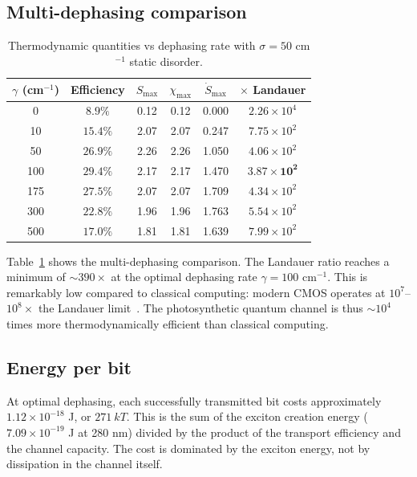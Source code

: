 \documentclass[aps,prl,twocolumn,showpacs,superscriptaddress]{revtex4-2}
\begin{document}
\subsection{Multi-dephasing comparison}

\begin{table}[htbp]
\caption{Thermodynamic quantities vs dephasing rate with $\sigma = 50$ cm$^{-1}$ static disorder.}
\label{tab:multigamma}
\centering
\begin{tabular}{cccccc}
\toprule
$\gamma$ (cm$^{-1}$) & Efficiency & $S_{\max}$ & $\chi_{\max}$ & $\dot{S}_{\max}$ & $\times$ Landauer \\
\midrule
0 & $8.9\%$ & 0.12 & 0.12 & 0.000 & $2.26\times10^4$ \\
10 & $15.4\%$ & 2.07 & 2.07 & 0.247 & $7.75\times10^2$ \\
50 & $26.9\%$ & 2.26 & 2.26 & 1.050 & $4.06\times10^2$ \\
100 & $29.4\%$ & 2.17 & 2.17 & 1.470 & $\mathbf{3.87\times10^2}$ \\
175 & $27.5\%$ & 2.07 & 2.07 & 1.709 & $4.34\times10^2$ \\
300 & $22.8\%$ & 1.96 & 1.96 & 1.763 & $5.54\times10^2$ \\
500 & $17.0\%$ & 1.81 & 1.81 & 1.639 & $7.99\times10^2$ \\
\bottomrule
\end{tabular}
\end{table}

Table~\ref{tab:multigamma} shows the multi-dephasing comparison. The Landauer ratio reaches a minimum of $\sim 390\times$ at the optimal dephasing rate $\gamma = 100$ cm$^{-1}$. This is remarkably low compared to classical computing: modern CMOS operates at $10^7$--$10^8\times$ the Landauer limit~\cite{Frank2002}. The photosynthetic quantum channel is thus $\sim 10^4$ times more thermodynamically efficient than classical computing.

\subsection{Energy per bit}

At optimal dephasing, each successfully transmitted bit costs approximately $1.12\times10^{-18}$ J, or $271\ kT$. This is the sum of the exciton creation energy ($7.09\times10^{-19}$ J at 280 nm) divided by the product of the transport efficiency and the channel capacity. The cost is dominated by the exciton energy, not by dissipation in the channel itself.
\end{document}
